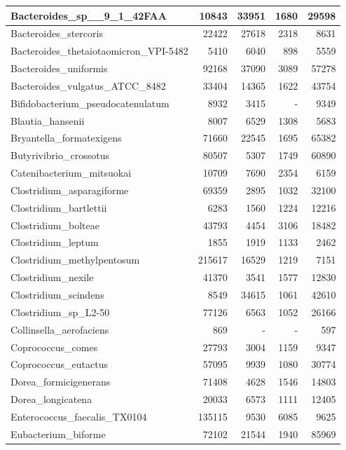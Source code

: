 \documentclass[12pt,a4paper]{article}
\begin{document}
\begin{table}[ht]
\begin{center}
\begin{tabular}{|l*{4}{|r}|}
Bacteroides\_sp\_\_9\_1\_42FAA & 10843 & 33951 & 1680 & 29598 \\ \hline
Bacteroides\_stercoris & 22422 & 27618 & 2318 & 8631 \\ \hline
Bacteroides\_thetaiotaomicron\_VPI-5482 & 5410 & 6040 & 898 & 5559 \\ \hline
Bacteroides\_uniformis & 92168 & 37090 & 3089 & 57278 \\ \hline
Bacteroides\_vulgatus\_ATCC\_8482 & 33404 & 14365 & 1622 & 43754 \\ \hline
Bifidobacterium\_pseudocatenulatum & 8932 & 3415 & - & 9349 \\ \hline
Blautia\_hansenii & 8007 & 6529 & 1308 & 5683 \\ \hline
Bryantella\_formatexigens & 71660 & 22545 & 1695 & 65382 \\ \hline
Butyrivibrio\_crossotus & 80507 & 5307 & 1749 & 60890 \\ \hline
Catenibacterium\_mitsuokai & 10709 & 7690 & 2354 & 6159 \\ \hline
Clostridium\_asparagiforme & 69359 & 2895 & 1032 & 32100 \\ \hline
Clostridium\_bartlettii & 6283 & 1560 & 1224 & 12216 \\ \hline
Clostridium\_bolteae & 43793 & 4454 & 3106 & 18482 \\ \hline
Clostridium\_leptum & 1855 & 1919 & 1133 & 2462 \\ \hline
Clostridium\_methylpentosum & 215617 & 16529 & 1219 & 7151 \\ \hline
Clostridium\_nexile & 41370 & 3541 & 1577 & 12830 \\ \hline
Clostridium\_scindens & 8549 & 34615 & 1061 & 42610 \\ \hline
Clostridium\_sp\_L2-50 & 77126 & 6563 & 1052 & 26166 \\ \hline
Collinsella\_aerofaciens & 869 & - & - & 597 \\ \hline
Coprococcus\_comes & 27793 & 3004 & 1159 & 9347 \\ \hline
Coprococcus\_eutactus & 57095 & 9939 & 1080 & 30774 \\ \hline
Dorea\_formicigenerans & 71408 & 4628 & 1546 & 14803 \\ \hline
Dorea\_longicatena & 20033 & 6573 & 1111 & 12405 \\ \hline
Enterococcus\_faecalis\_TX0104 & 135115 & 9530 & 6085 & 9625 \\ \hline
Eubacterium\_biforme & 72102 & 21544 & 1940 & 85969 \\ \hline

\end{tabular}
\end{center}
\end{table}
\end{document}
